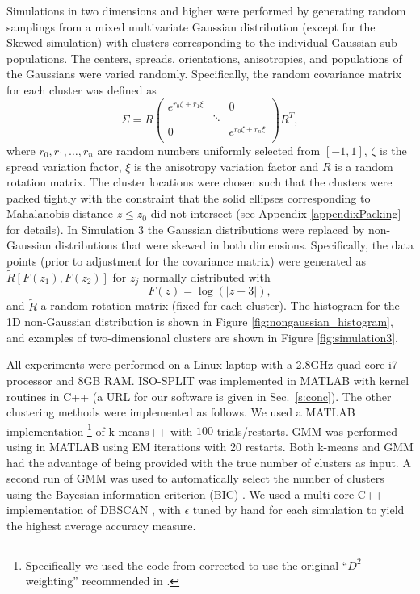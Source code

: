 \documentclass[10pt]{article}
\begin{document}
Simulations in two dimensions and higher were performed by generating random samplings from a mixed multivariate Gaussian distribution (except for the Skewed simulation) with clusters corresponding to the individual Gaussian sub-populations. The centers, spreads, orientations, anisotropies, and populations of the Gaussians were varied randomly. Specifically, the random covariance matrix for each cluster was defined as
\[
\Sigma=R
\left(
\begin{array}{ccc}
e^{r_0\zeta + r_1\xi} & & 0 \\
 & \ddots &  \\
 0 &  & e^{r_0\zeta + r_n\xi} \\
\end{array}
\right)R^T,
\]
where $r_0,r_1,\dots,r_n$ are random numbers uniformly selected from $[-1,1]$, $\zeta$ is the spread variation factor, $\xi$ is the anisotropy variation factor and $R$ is a random rotation matrix. The cluster locations were chosen such that the clusters were packed tightly with the constraint that the solid ellipses corresponding to Mahalanobis distance $z\leq z_0$ did not intersect (see Appendix \ref{appendixPacking} for details). In Simulation 3 the Gaussian distributions were replaced by non-Gaussian distributions that were skewed in both dimensions. Specifically, the data points (prior to adjustment for the covariance matrix) were generated as $\tilde{R}[F(z_1),F(z_2)]$ for $z_j$ normally distributed with
\begin{equation}
\label{eq:nongaussian}F(z)=\log(|z+3|),
\end{equation}
and $\tilde{R}$ a random rotation matrix (fixed for each cluster). The histogram for the 1D non-Gaussian distribution is shown in Figure \ref{fig:nongaussian_histogram}, and examples of two-dimensional clusters are shown in Figure \ref{fig:simulation3}.

All experiments were performed on a Linux laptop with a 2.8GHz quad-core
i7 processor and 8GB RAM.
ISO-SPLIT was implemented in MATLAB with kernel routines in C++
(a URL for our software is given in Sec.~\ref{s:conc}).
The other clustering methods were implemented as follows.
We used a MATLAB implementation%
\footnote{Specifically we used the code from \citep{kmeanspp_sorber} corrected to use
  the original ``$D^2$ weighting'' recommended in \citep{kmeanspp}.}
 of k-means++
 with $100$ trials/restarts. GMM was performed using \citet{vlfeat} in MATLAB using EM iterations with 20 restarts. Both k-means and GMM had the advantage of being provided with the true number of clusters as input. A second run of GMM was used to automatically select the number of clusters using the Bayesian information criterion (BIC) \citep{BIC}. We used a multi-core C++ implementation of DBSCAN \citep{dbscan_dbp}, with $\epsilon$ tuned by hand for each simulation to yield the highest average accuracy measure.
\end{document}
